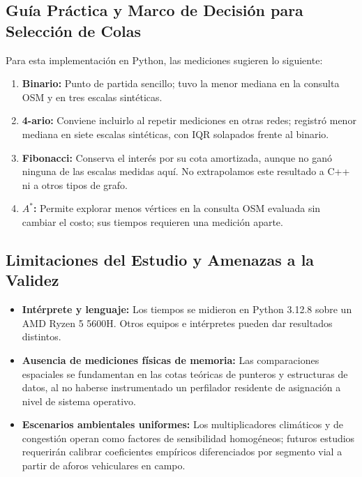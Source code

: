 \subsection{Guía Práctica y Marco de Decisión para Selección de Colas}
Para esta implementación en Python, las mediciones sugieren lo siguiente:
\begin{enumerate}
    \item \textbf{Binario:} Punto de partida sencillo; tuvo la menor mediana en la consulta OSM y en tres escalas sintéticas.
    \item \textbf{4-ario:} Conviene incluirlo al repetir mediciones en otras redes; registró menor mediana en siete escalas sintéticas, con IQR solapados frente al binario.
    \item \textbf{Fibonacci:} Conserva el interés por su cota amortizada, aunque no ganó ninguna de las escalas medidas aquí. No extrapolamos este resultado a C++ ni a otros tipos de grafo.
    \item \textbf{$A^*$:} Permite explorar menos vértices en la consulta OSM evaluada sin cambiar el costo; sus tiempos requieren una medición aparte.
\end{enumerate}

\subsection{Limitaciones del Estudio y Amenazas a la Validez}
\begin{itemize}
    \item \textbf{Intérprete y lenguaje:} Los tiempos se midieron en Python 3.12.8 sobre un AMD Ryzen 5 5600H. Otros equipos e intérpretes pueden dar resultados distintos.
    \item \textbf{Ausencia de mediciones físicas de memoria:} Las comparaciones espaciales se fundamentan en las cotas teóricas de punteros y estructuras de datos, al no haberse instrumentado un perfilador residente de asignación a nivel de sistema operativo.
    \item \textbf{Escenarios ambientales uniformes:} Los multiplicadores climáticos y de congestión operan como factores de sensibilidad homogéneos; futuros estudios requerirán calibrar coeficientes empíricos diferenciados por segmento vial a partir de aforos vehiculares en campo.
\end{itemize}
